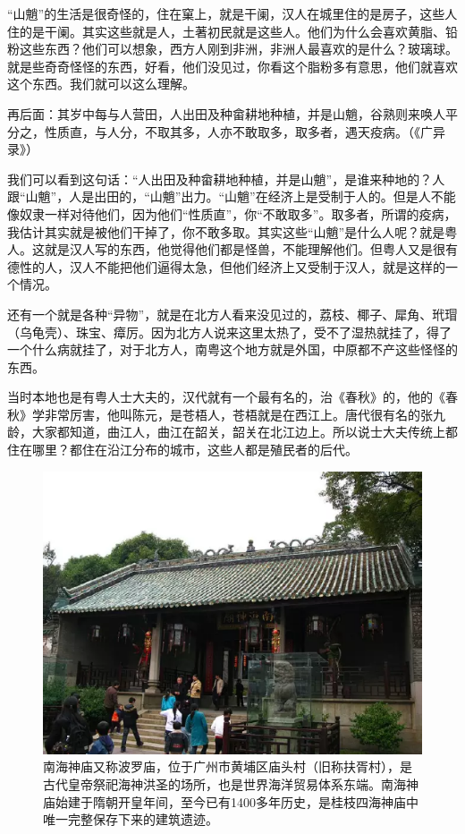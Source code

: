 “山魈”的生活是很奇怪的，住在窠上，就是干阑，汉人在城里住的是房子，这些人住的是干阑。其实这些就是人，土著初民就是这些人。他们为什么会喜欢黄脂、铅粉这些东西？他们可以想象，西方人刚到非洲，非洲人最喜欢的是什么？玻璃球。就是些奇奇怪怪的东西，好看，他们没见过，你看这个脂粉多有意思，他们就喜欢这个东西。我们就可以这么理解。

再后面：其岁中每与人营田，人出田及种畲耕地种植，并是山魈，谷熟则来唤人平分之，性质直，与人分，不取其多，人亦不敢取多，取多者，遇天疫病。（《广异录》）

我们可以看到这句话：“人出田及种畲耕地种植，并是山魈”，是谁来种地的？人跟“山魈”，人是出田的，“山魈”出力。“山魈”在经济上是受制于人的。但是人不能像奴隶一样对待他们，因为他们“性质直”，你“不敢取多”。取多者，所谓的疫病，我估计其实就是被他们干掉了，你不敢多取。其实这些“山魈”是什么人呢？就是粤人。这就是汉人写的东西，他觉得他们都是怪兽，不能理解他们。但粤人又是很有德性的人，汉人不能把他们逼得太急，但他们经济上又受制于汉人，就是这样的一个情况。

还有一个就是各种“异物”，就是在北方人看来没见过的，荔枝、椰子、犀角、玳瑁（乌龟壳）、珠宝、瘴厉。因为北方人说来这里太热了，受不了湿热就挂了，得了一个什么病就挂了，对于北方人，南粤这个地方就是外国，中原都不产这些怪怪的东西。

当时本地也是有粤人士大夫的，汉代就有一个最有名的，治《春秋》的，他的《春秋》学非常厉害，他叫陈元，是苍梧人，苍梧就是在西江上。唐代很有名的张九龄，大家都知道，曲江人，曲江在韶关，韶关在北江边上。所以说士大夫传统上都住在哪里？都住在沿江分布的城市，这些人都是殖民者的后代。

\begin{figure}
	\centering
	\includegraphics[width=\textwidth]{images/image-29}
	\caption{南海神庙又称波罗庙，位于广州市黄埔区庙头村（旧称扶胥村），是古代皇帝祭祀海神洪圣的场所，也是世界海洋贸易体系东端。南海神庙始建于隋朝开皇年间，至今已有1400多年历史，是桂枝四海神庙中唯一完整保存下来的建筑遗迹。}
\end{figure}

